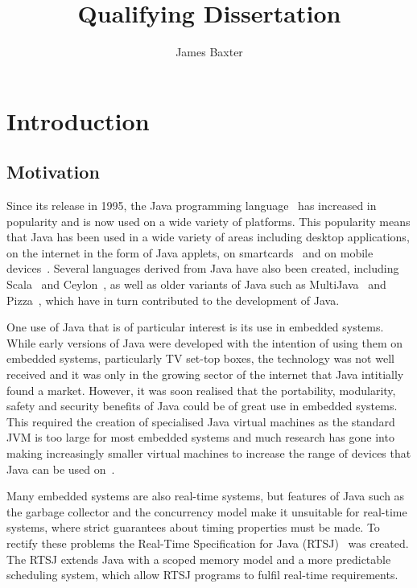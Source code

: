 \documentclass[a4paper,12pt]{article}
\title{Qualifying Dissertation}
\author{James Baxter}
\date{}
\begin{document}
\maketitle

\section{Introduction}


\subsection{Motivation}

Since its release in 1995, the Java programming language~\cite{gosling2013} has increased in popularity and is now used on a wide variety of platforms.
This popularity means that Java has been used in a wide variety of areas including desktop applications, on the internet in the form of Java applets, on smartcards~\cite{chen2000} and on mobile devices~\cite{oracle2014}.
Several languages derived from Java have also been created, including Scala~\cite{lausanne2015} and Ceylon~\cite{redhat2015}, as well as older variants of Java such as MultiJava~\cite{clifton2006} and Pizza~\cite{odersky1997}, which have in turn contributed to the development of Java.

One use of Java that is of particular interest is its use in embedded systems.
While early versions of Java were developed with the intention of using them on embedded systems, particularly TV set-top boxes, the technology was not well received and it was only in the growing sector of the internet that Java intitially found a market. %
However, it was soon realised that the portability, modularity, safety and security benefits of Java could be of great use in embedded systems. %
This required the creation of specialised Java virtual machines as the standard JVM is too large for most embedded systems and much research has gone into making increasingly smaller virtual machines to increase the range of devices that Java can be used on~\cite{caska2011,thomm2010}.

Many embedded systems are also real-time systems, but features of Java such as the garbage collector and the concurrency model make it unsuitable for real-time systems, where strict guarantees about timing properties must be made.
To rectify these problems the Real-Time Specification for Java (RTSJ)~\cite{gosling2000} was created.
The RTSJ extends Java with a scoped memory model and a more predictable scheduling system, which allow RTSJ programs to fulfil real-time requirements.
\end{document}
